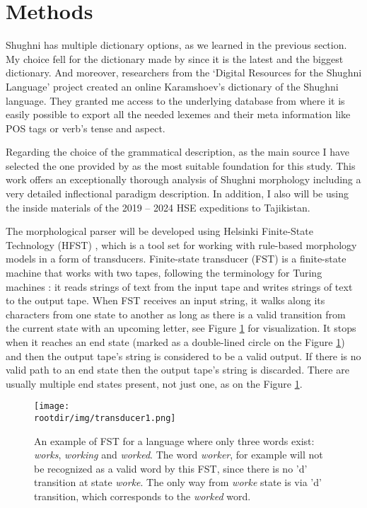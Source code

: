 \section{Methods}
\par Shughni has multiple dictionary options, as we learned in the previous section. My choice fell for the dictionary made by \textcite{karamshoev_dict_1988} since it is the latest and the biggest dictionary. And moreover, researchers from the `Digital Resources for the Shughni Language' project \parencite{makarov_digital_2022} created an online Karamshoev's dictionary of the Shughni language. They granted me access to the underlying database from where it is easily possible to export all the needed lexemes and their meta information like POS tags or verb's tense and aspect.
\par Regarding the choice of the grammatical description, as the main source I have selected the one provided by \textcite{parker_shughni_2023} as the most suitable foundation for this study. This work offers an exceptionally thorough analysis of Shughni morphology including a very detailed inflectional paradigm description. In addition, I also will be using the inside materials of the 2019 -- 2024 HSE expeditions to Tajikistan.
\par The morphological parser will be developed using Helsinki Finite-State Technology (HFST) \parencite{linden_hfst_2009}, which is a tool set for working with rule-based morphology models in a form of transducers. Finite-state transducer (FST) is a finite-state machine that works with two tapes, following the terminology for Turing machines \parencite{Turing_1937}: it reads strings of text from the input tape and writes strings of text to the output tape. When FST receives an input string, it walks along its characters from one state to another as long as there is a valid transition from the current state with an upcoming letter, see Figure \ref{fig:fst1} for visualization. It stops when it reaches an end state (marked as a double-lined circle on the Figure \ref{fig:fst1}) and then the output tape's string is considered to be a valid output. If there is no valid path to an end state then the output tape's string is discarded. There are usually multiple end states present, not just one, as on the Figure \ref{fig:fst1}.
\begin{figure}[!ht]
    \centering
    \texttt{[image: \\rootdir/img/transducer1.png]}
    \caption{An example of FST for a language where only three words exist: \textit{works}, \textit{working} and \textit{worked}. The word \textit{worker}, for example will not be recognized as a valid word by this FST, since there is no 'd' transition at state \textit{worke}. The only way from \textit{worke} state is via 'd' transition, which corresponds to the \textit{worked} word. \parencite{beesley_fst_2002}}
    \label{fig:fst1}
\end{figure}
